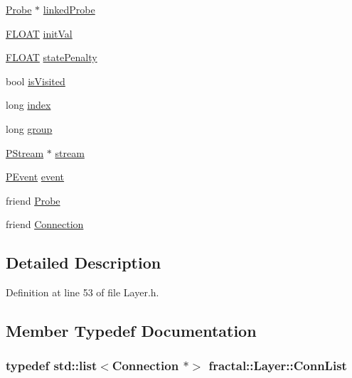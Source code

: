\begin{DoxyCompactItemize}
\item 
\hyperlink{classfractal_1_1Probe}{Probe} $\ast$ \hyperlink{classfractal_1_1Layer_a2c58f72836357e0ab4b16e7e2ee5b4b7}{linked\+Probe}
\item 
\hyperlink{namespacefractal_a1c2d2530689575d5ccb56bae52af70d3}{F\+L\+O\+A\+T} \hyperlink{classfractal_1_1Layer_a275d1bbf7c4d6976b695311dc8e7a71e}{init\+Val}
\item 
\hyperlink{namespacefractal_a1c2d2530689575d5ccb56bae52af70d3}{F\+L\+O\+A\+T} \hyperlink{classfractal_1_1Layer_a2d9020e0da1993e16d9fcd9b86b94d91}{state\+Penalty}
\item 
bool \hyperlink{classfractal_1_1Layer_a4c2ad17160182ca22905e7439138a93e}{is\+Visited}
\item 
long \hyperlink{classfractal_1_1Layer_ad144193dca351470ca700e0efcead8a2}{index}
\item 
long \hyperlink{classfractal_1_1Layer_a10d561417d3701d22b3a0e87178f1dcb}{group}
\item 
\hyperlink{classfractal_1_1PStream}{P\+Stream} $\ast$ \hyperlink{classfractal_1_1Layer_aef36108269bffa0d3ecbd67f190362fa}{stream}
\item 
\hyperlink{classfractal_1_1PEvent}{P\+Event} \hyperlink{classfractal_1_1Layer_a6f4b1783eae158a746c0f2d43114cba3}{event}
\item 
friend \hyperlink{classfractal_1_1Layer_af01de55572c632f393ec441fc4c244f5}{Probe}
\item 
friend \hyperlink{classfractal_1_1Layer_a462ead8af5a9f5acfc359a348488b87f}{Connection}
\end{DoxyCompactItemize}


\subsection{Detailed Description}


Definition at line 53 of file Layer.\+h.



\subsection{Member Typedef Documentation}
\hypertarget{classfractal_1_1Layer_a112ea548588704c0915a32aa3269b5a6}{
\subsubsection[{Conn\+List}]{\setlength{\rightskip}{0pt plus 5cm}typedef std\+::list$<${\bf Connection} $\ast$$>$ {\bf fractal\+::\+Layer\+::\+Conn\+List}}}\label{classfractal_1_1Layer_a112ea548588704c0915a32aa3269b5a6}


